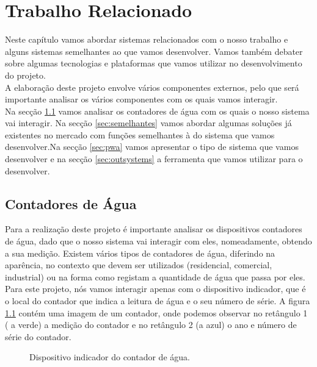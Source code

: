 %
%
\chapter{Trabalho Relacionado} \label{cap:trabrelacionado}
Neste capítulo vamos abordar sistemas relacionados com o nosso trabalho e alguns sistemas semelhantes ao que vamos desenvolver. Vamos também debater sobre algumas tecnologias e plataformas que vamos utilizar no desenvolvimento do projeto.\\
A elaboração deste projeto envolve vários componentes externos, pelo que será importante analisar os vários componentes com os quais vamos interagir.\\
Na secção \ref{sec:cont} vamos analisar os contadores de água com os quais o nosso sistema vai interagir. Na secção \ref{sec:semelhantes} vamos abordar algumas soluções já existentes no mercado com funções semelhantes à do sistema que vamos desenvolver.Na secção \ref{sec:pwa} vamos apresentar o tipo de sistema que vamos desenvolver e na secção \ref{sec:outsystems} a ferramenta que vamos utilizar para o desenvolver.


\section{Contadores de Água} \label{sec:cont}
Para a realização deste projeto é importante analisar os dispositivos contadores de água, dado que o nosso sistema vai interagir com eles, nomeadamente, obtendo a sua medição.
Existem vários tipos de contadores de água, diferindo na aparência, no contexto que devem ser utilizados (residencial, comercial, industrial) ou na forma como registam a quantidade de água que passa por eles. Para este projeto, nós vamos interagir apenas com o dispositivo indicador, que é o local do contador que indica a leitura de água e o seu número de série.
A figura \ref{fig:contador} contém uma imagem de um contador, onde podemos observar no retângulo 1 ( a verde) a medição do contador e no retângulo 2 (a azul) o ano e número de série do contador.

\begin{figure}[h!]
\begin{center}
\caption{Dispositivo indicador do contador de água.}
\label{fig:contador}
\end{center}
\end{figure}

